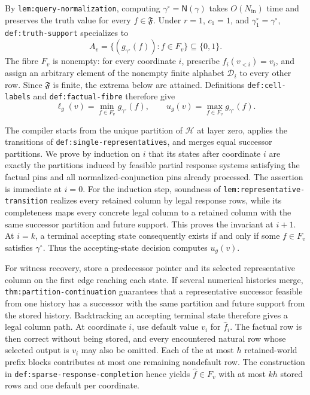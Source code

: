 By \texttt{lem:query-normalization}, computing \(\gamma^{\circ}=\mathsf N(\gamma)\) takes \(O(N_{\mathrm{in}})\) time and preserves the truth value for every \(f\in\mathfrak F\).  Under \(r=1\), \(c_1=1\), and \(\gamma_1^{\circ}=\gamma^{\circ}\), \texttt{def:truth-support} specializes to
\[
 A_v=\{(g_{\gamma^{\circ}}(f)):f\in F_v\}\subseteq\{0,1\}.
\]
The fibre \(F_v\) is nonempty: for every coordinate \(i\), prescribe \(f_i(v_{<i})=v_i\), and assign an arbitrary element of the nonempty finite alphabet \(\mathcal D_i\) to every other row.  Since \(\mathfrak F\) is finite, the extrema below are attained.  Definitions \texttt{def:cell-labels} and \texttt{def:factual-fibre} therefore give
\[
 \ell_g(v)=\min_{f\in F_v}g_{\gamma^{\circ}}(f),
 \qquad
 u_g(v)=\max_{f\in F_v}g_{\gamma^{\circ}}(f).
\tag{4}
\]

The compiler starts from the unique partition of \(\mathcal H\) at layer zero, applies the transitions of \texttt{def:single-representatives}, and merges equal successor partitions.  We prove by induction on \(i\) that its states after coordinate \(i\) are exactly the partitions induced by feasible partial response systems satisfying the factual pins and all normalized-conjunction pins already processed.  The assertion is immediate at \(i=0\).  For the induction step, soundness of \texttt{lem:representative-transition} realizes every retained column by legal response rows, while its completeness maps every concrete legal column to a retained column with the same successor partition and future support.  This proves the invariant at \(i+1\).  At \(i=k\), a terminal accepting state consequently exists if and only if some \(f\in F_v\) satisfies \(\gamma^{\circ}\).  Thus the accepting-state decision computes \(u_g(v)\).

For witness recovery, store a predecessor pointer and its selected representative column on the first edge reaching each state.  If several numerical histories merge, \texttt{thm:partition-continuation} guarantees that a representative successor feasible from one history has a successor with the same partition and future support from the stored history.  Backtracking an accepting terminal state therefore gives a legal column path.  At coordinate \(i\), use default value \(v_i\) for \(\widehat f_i\).  The factual row is then correct without being stored, and every encountered natural row whose selected output is \(v_i\) may also be omitted.  Each of the at most \(h\) retained-world prefix blocks contributes at most one remaining nondefault row.  The construction in \texttt{def:sparse-response-completion} hence yields \(\widehat f\in F_v\) with at most \(kh\) stored rows and one default per coordinate.

